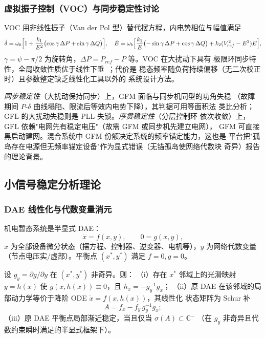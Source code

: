 \subsubsection{虚拟振子控制（VOC）与同步稳定性讨论}

VOC 用非线性振子（Van der Pol 型）替代摆方程，内电势相位与幅值满足
\begin{equation}
\dot\delta=\omega_b\Bigl[1+\frac{k_1}{E^2}\bigl(\cos\gamma\,\Delta P+
\sin\gamma\,\Delta Q\bigr)\Bigr],\quad
\dot E=\omega_b\Bigl[\frac{k_1}{E}\bigl(-\sin\gamma\,\Delta P+\cos\gamma\,\Delta Q\bigr)
+k_2(V_{ref}^2-E^2)E\Bigr],
\label{sec:dy-th-ctl-eq-voc}
\end{equation}
$\gamma=\psi-\pi/2$ 为旋转角，$\Delta P=P_{ref}-P$ 等。VOC 在大扰动下具有
极限环同步特性，全局收敛性质优于线性下垂~\cite{ctl:johnson-voc}；代价是
稳态频率随负荷持续偏移（无二次校正时）且参数整定缺乏线性化工具以外的
系统设计方法。

\begin{remark}
\emph{同步稳定性}（大扰动保持同步）上，GFM 面临与同步机同型的功角失稳
（故障期间 $P$-$\delta$ 曲线塌陷、限流后等效内电势下降），其判据可用等面积法
类比分析；GFL 的大扰动失稳则是 PLL 失锁。\emph{序贯稳定性}（分层控制环
依次收敛）上，GFL 依赖"电网先有稳定电压"（故需 GFM 或同步机先建立电网），
GFM 可直接黑启动建网。混合系统中 GFM 份额决定系统的频率锚定能力，这也是
平台把"孤岛存在电源但无频率锚定设备"作为显式错误（无锚孤岛使网络代数块
奇异）报告的理论背景。
\end{remark}

\subsection{小信号稳定分析理论}\label{sec:dy-th-ctl-ss}

\subsubsection{DAE 线性化与代数变量消元}

机电暂态系统是半显式 DAE：
\begin{equation}
\dot x=f(x,y),\qquad 0=g(x,y),
\label{sec:dy-th-ctl-eq-dae}
\end{equation}
$x$ 为全部设备微分状态（摆方程、控制器、逆变器、电机等），$y$ 为网络代数变量
（节点电压实/虚部）。平衡点 $(x^*,y^*)$ 满足 $f=0,g=0$。

\begin{theorem}\label{sec:dy-th-ctl-thm-schur}
设 $g_y=\partial g/\partial y$ 在 $(x^*,y^*)$ 非奇异。则：
（i）存在 $x^*$ 邻域上的光滑映射 $y=h(x)$ 使 $g(x,h(x))\equiv0$，且
$h_x=-g_y^{-1}g_x$；
（ii）原 DAE 在该邻域的局部动力学等价于降阶 ODE $\dot x=f(x,h(x))$，其线性化
状态矩阵为 Schur 补
\begin{equation}
A=f_x-f_y\,g_y^{-1}g_x;
\label{sec:dy-th-ctl-eq-schur}
\end{equation}
（iii）原 DAE 平衡点局部渐近稳定，当且仅当 $\sigma(A)\subset\mathbb C^-$
（在 $g_y$ 非奇异且代数约束瞬时满足的半显式框架下）。
\end{theorem}

